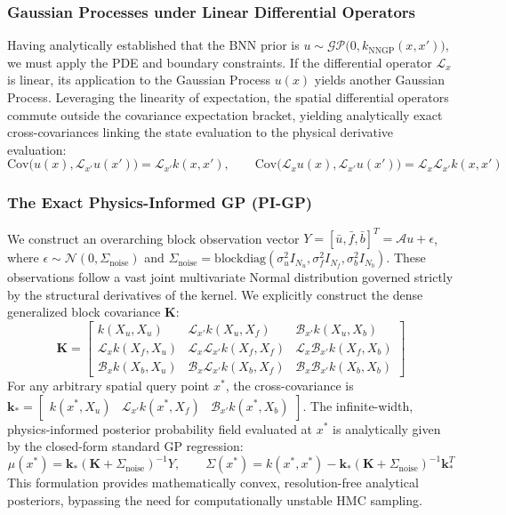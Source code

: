 \documentclass{article}
\begin{document}
\subsubsection{Gaussian Processes under Linear Differential Operators}
Having analytically established that the BNN prior is $u \sim \mathcal{GP}\big(0, k_{\text{NNGP}}(x, x')\big)$, we must apply the PDE and boundary constraints. If the differential operator $\mathcal{L}_x$ is linear, its application to the Gaussian Process $u(x)$ yields another Gaussian Process. 
Leveraging the linearity of expectation, the spatial differential operators commute outside the covariance expectation bracket, yielding analytically exact cross-covariances linking the state evaluation to the physical derivative evaluation:
\begin{equation}
\text{Cov}\big(u(x), \mathcal{L}_{x'} u(x')\big) = \mathcal{L}_{x'} k(x, x'), \qquad \text{Cov}\big(\mathcal{L}_x u(x), \mathcal{L}_{x'} u(x')\big) = \mathcal{L}_x \mathcal{L}_{x'} k(x, x')
\end{equation}

\subsubsection{The Exact Physics-Informed GP (PI-GP)}
We construct an overarching block observation vector $Y = [\bar u, \bar f, \bar b]^T = \mathcal{A} u + \epsilon$, where $\epsilon \sim \mathcal{N}(0, \Sigma_{\text{noise}})$ and $\Sigma_{\text{noise}} = \text{blockdiag}(\sigma_u^2 I_{N_u}, \sigma_f^2 I_{N_f}, \sigma_b^2 I_{N_b})$. 
These observations follow a vast joint multivariate Normal distribution governed strictly by the structural derivatives of the kernel. We explicitly construct the dense generalized block covariance $\mathbf{K}$:
\begin{equation}
\mathbf{K} = \begin{bmatrix}
k(X_u, X_u) & \mathcal{L}_{x'}k(X_u, X_f) & \mathcal{B}_{x'}k(X_u, X_b) \\
\mathcal{L}_x k(X_f, X_u) & \mathcal{L}_x \mathcal{L}_{x'} k(X_f, X_f) & \mathcal{L}_x \mathcal{B}_{x'} k(X_f, X_b) \\
\mathcal{B}_x k(X_b, X_u) & \mathcal{B}_x \mathcal{L}_{x'} k(X_b, X_f) & \mathcal{B}_x \mathcal{B}_{x'} k(X_b, X_b)
\end{bmatrix}
\end{equation}
For any arbitrary spatial query point $x^*$, the cross-covariance is $\mathbf{k}_{*} = \begin{bmatrix} k(x^*, X_u) & \mathcal{L}_{x'}k(x^*, X_f) & \mathcal{B}_{x'}k(x^*, X_b) \end{bmatrix}$. The infinite-width, physics-informed posterior probability field evaluated at $x^*$ is analytically given by the closed-form standard GP regression:
\begin{equation}
\mu(x^*) = \mathbf{k}_{*} (\mathbf{K} + \Sigma_{\text{noise}})^{-1} Y, \qquad \Sigma(x^*) = k(x^*, x^*) - \mathbf{k}_{*} (\mathbf{K} + \Sigma_{\text{noise}})^{-1} \mathbf{k}_{*}^T \label{eq:pigp_posterior}
\end{equation}
This formulation provides mathematically convex, resolution-free analytical posteriors, bypassing the need for computationally unstable HMC sampling.
\end{document}
